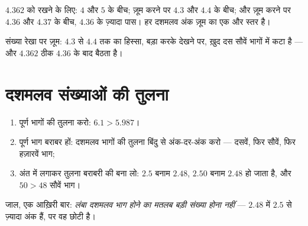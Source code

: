 \begin{example}[यह रेखा पर कहाँ है?]\label{ex:g5:decimals:line}
$4.362$ को रखने के लिए: $4$ और $5$ के बीच; ज़ूम करने पर $4.3$ और
$4.4$ के बीच; और ज़ूम करने पर $4.36$ और $4.37$ के बीच, $4.36$ के
ज़्यादा पास। हर दशमलव अंक ज़ूम का एक और स्तर है।
\end{example}

\begin{omfigure}

{\small संख्या रेखा पर ज़ूम: $4.3$ से $4.4$ तक का हिस्सा, बड़ा
करके देखने पर, ख़ुद दस सौवें भागों में कटा है --- और $4.362$
ठीक $4.36$ के बाद बैठता है।}
\end{omfigure}

\section{दशमलव संख्याओं की तुलना}

\begin{method}[दो दशमलव संख्याओं की तुलना]\label{met:g5:decimals:compare}
\begin{enumerate}
  \item पूर्ण भागों की तुलना करो: $6.1 > 5.987$।
  \item पूर्ण भाग बराबर हों: दशमलव भागों की तुलना बिंदु से
        अंक-दर-अंक करो --- दसवें, फिर सौवें, फिर हज़ारवें
        भाग;
  \item अंत में  लगाकर तुलना बराबरी की बना लो:
        $2.5$ बनाम $2.48$, $2.50$ बनाम $2.48$ हो जाता है, और
        $50 > 48$ सौवें भाग।
\end{enumerate}
जाल, एक आख़िरी बार: \emph{लंबा दशमलव भाग होने का मतलब बड़ी संख्या
होना नहीं} --- $2.48$ में $2.5$ से ज़्यादा अंक हैं, पर वह छोटी है।
\end{method}

